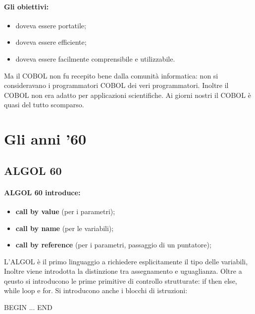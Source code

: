 \paragraph{Gli obiettivi:}

\begin{itemize}
    \item doveva essere portatile;
    \item doveva essere efficiente;
    \item doveva essere facilmente comprensibile e utilizzabile.
\end{itemize}

Ma il COBOL non fu recepito bene dalla comunità informatica: non si consideravano i programmatori
COBOL dei veri programmatori. Inoltre il COBOL non era adatto per applicazioni scientifiche.
Ai giorni nostri il COBOL è quasi del tutto scomparso.

\section{Gli anni '60}

\subsection{ALGOL 60}



\paragraph{ALGOL 60 introduce:}

\begin{itemize}
    \item \textbf{call by value} (per i parametri);
    \item \textbf{call by name} (per le variabili);
    \item \textbf{call by reference} (per i parametri, passaggio di un puntatore);
\end{itemize}

L'ALGOL è il primo linguaggio a richiedere esplicitamente il tipo delle variabili, Inoltre
viene introdotta la distinzione tra assegnamento e uguaglianza. Oltre a qeusto si introducono
le prime primitive di controllo strutturate: if then else, while loop e for. Si introducono anche i blocchi di istruzioni:
\begin{center}
    BEGIN ... END
\end{center}

